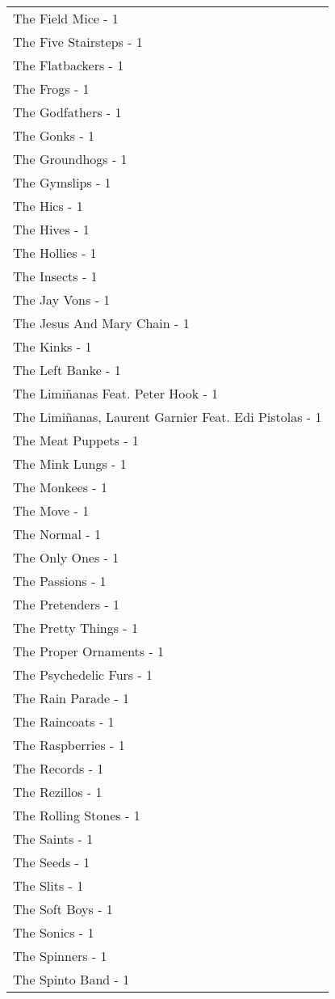 \documentclass[
]{article}
\begin{document}
\begin{longtable}{l}
The Field Mice - 1 \\ 
The Five Stairsteps - 1 \\ 
The Flatbackers - 1 \\ 
The Frogs - 1 \\ 
The Godfathers - 1 \\ 
The Gonks - 1 \\ 
The Groundhogs - 1 \\ 
The Gymslips - 1 \\ 
The Hics - 1 \\ 
The Hives - 1 \\ 
The Hollies - 1 \\ 
The Insects - 1 \\ 
The Jay Vons - 1 \\ 
The Jesus And Mary Chain - 1 \\ 
The Kinks - 1 \\ 
The Left Banke - 1 \\ 
The Limiñanas Feat. Peter Hook - 1 \\ 
The Limiñanas, Laurent Garnier Feat. Edi Pistolas - 1 \\ 
The Meat Puppets - 1 \\ 
The Mink Lungs - 1 \\ 
The Monkees - 1 \\ 
The Move - 1 \\ 
The Normal - 1 \\ 
The Only Ones - 1 \\ 
The Passions - 1 \\ 
The Pretenders - 1 \\ 
The Pretty Things - 1 \\ 
The Proper Ornaments - 1 \\ 
The Psychedelic Furs - 1 \\ 
The Rain Parade - 1 \\ 
The Raincoats - 1 \\ 
The Raspberries - 1 \\ 
The Records - 1 \\ 
The Rezillos - 1 \\ 
The Rolling Stones - 1 \\ 
The Saints - 1 \\ 
The Seeds - 1 \\ 
The Slits - 1 \\ 
The Soft Boys - 1 \\ 
The Sonics - 1 \\ 
The Spinners - 1 \\ 
The Spinto Band - 1 \\ 

\end{longtable}
\end{document}
